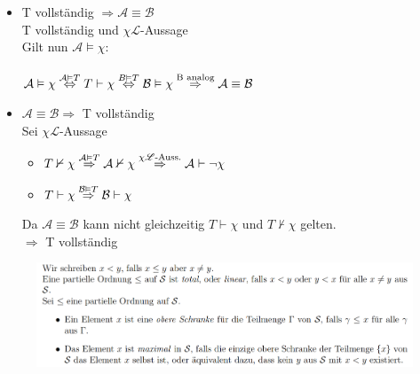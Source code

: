 \documentclass[a4paper]{scrartcl}
\begin{document}
    \begin{itemize}
        \item T vollständig $\Rightarrow \mathcal{A} \equiv \mathcal{B}$\\
            T vollständig und $\chi \mathscr{L}$-Aussage\\
            Gilt nun $\mathcal{A} \vDash \chi$:\\
            \\$\mathcal{A} \vDash \chi\\
            \overset{\mathcal{A}\vDash T}{\Leftrightarrow} T \vdash \chi\\
            \overset{B \vDash T}{\Leftrightarrow}\mathcal{B} \vDash \chi\\
            \overset{\text{B analog}}{\Rightarrow} \mathcal{A} \equiv \mathcal{B}$\\
        
        \item $\mathcal{A} \equiv \mathcal{B} \Rightarrow$ T vollständig\\
            Sei $\chi \mathscr{L}$-Aussage\\
            \begin{itemize}
                \item $T \nvdash \chi\\
                    \overset{\mathcal{A} \vDash T}{\Rightarrow} \mathcal{A} \nvdash \chi\\
                    \overset{\chi \mathscr{L}\text{-Auss.}}{\Rightarrow} \mathcal{A} \vdash \neg \chi$\\

                \item $T \vdash \chi\\
                    \overset{\mathcal{B} \vDash T}{\Rightarrow} \mathcal{B} \vdash \chi$\\
            \end{itemize}

            Da $\mathcal{A} \equiv \mathcal{B}$ kann nicht gleichzeitig $T \vdash \chi$ und $T \nvdash \chi$ gelten.\\
            $\Rightarrow$ T vollständig\\

    \end{itemize}

\newpage

\begin{figure}[H]
    \centering
    \includegraphics[scale=0.3]{./total.png}
    \label{fig:./total}
\end{figure}
\end{document}
